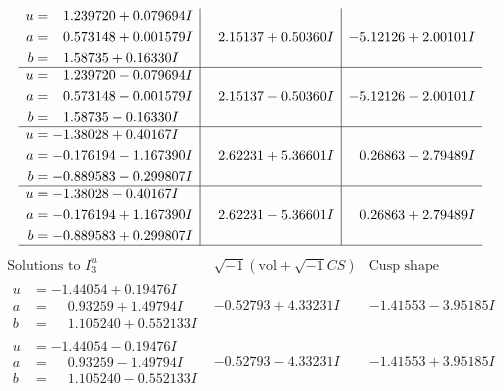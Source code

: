 \documentclass[1p]{elsarticle_modified}
\theoremstyle{definition}
\newcommand{\I}{\sqrt{-1}}
\begin{document}
$$\begin{array}{c|c|c}
\begin{aligned}
u &= \phantom{-}1.239720 + 0.079694 I \\
a &= \phantom{-}0.573148 + 0.001579 I \\
b &= \phantom{-}1.58735 + 0.16330 I\end{aligned}
 & \phantom{-}2.15137 + 0.50360 I & -5.12126 + 2.00101 I \\ \hline\begin{aligned}
u &= \phantom{-}1.239720 - 0.079694 I \\
a &= \phantom{-}0.573148 - 0.001579 I \\
b &= \phantom{-}1.58735 - 0.16330 I\end{aligned}
 & \phantom{-}2.15137 - 0.50360 I & -5.12126 - 2.00101 I \\ \hline\begin{aligned}
u &= -1.38028 + 0.40167 I \\
a &= -0.176194 - 1.167390 I \\
b &= -0.889583 - 0.299807 I\end{aligned}
 & \phantom{-}2.62231 + 5.36601 I & \phantom{-}0.26863 - 2.79489 I \\ \hline\begin{aligned}
u &= -1.38028 - 0.40167 I \\
a &= -0.176194 + 1.167390 I \\
b &= -0.889583 + 0.299807 I\end{aligned}
 & \phantom{-}2.62231 - 5.36601 I & \phantom{-}0.26863 + 2.79489 I\\
 \hline 
 \end{array}$$\newpage$$\begin{array}{c|c|c}  
\text{Solutions to }I^u_{3}& \I (\text{vol} + \sqrt{-1}CS) & \text{Cusp shape}\\
 \hline 
\begin{aligned}
u &= -1.44054 + 0.19476 I \\
a &= \phantom{-}0.93259 + 1.49794 I \\
b &= \phantom{-}1.105240 + 0.552133 I\end{aligned}
 & -0.52793 + 4.33231 I & -1.41553 - 3.95185 I \\ \hline\begin{aligned}
u &= -1.44054 - 0.19476 I \\
a &= \phantom{-}0.93259 - 1.49794 I \\
b &= \phantom{-}1.105240 - 0.552133 I\end{aligned}
 & -0.52793 - 4.33231 I & -1.41553 + 3.95185 I \\ \hline\begin{aligned}

\end{aligned}
\end{array}$$
\end{document}
